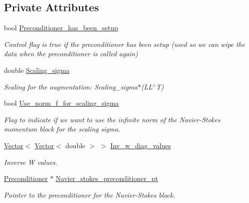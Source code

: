 \subsection*{Private Attributes}
\begin{DoxyCompactItemize}
\item 
bool \hyperlink{classoomph_1_1LagrangeEnforcedFlowPreconditioner_a4a886ec6c0ec223b5f24e27efcc9584b}{Preconditioner\+\_\+has\+\_\+been\+\_\+setup}
\begin{DoxyCompactList}\small\item\em Control flag is true if the preconditioner has been setup (used so we can wipe the data when the preconditioner is called again) \end{DoxyCompactList}\item 
double \hyperlink{classoomph_1_1LagrangeEnforcedFlowPreconditioner_aa555c464abd2ac23045a52336123c0a2}{Scaling\+\_\+sigma}
\begin{DoxyCompactList}\small\item\em Scaling for the augmentation\+: Scaling\+\_\+sigma$\ast$(L\+L$^\wedge$T) \end{DoxyCompactList}\item 
bool \hyperlink{classoomph_1_1LagrangeEnforcedFlowPreconditioner_a4da1aa7fd0b1a4f9d8eef074f4d1ed81}{Use\+\_\+norm\+\_\+f\+\_\+for\+\_\+scaling\+\_\+sigma}
\begin{DoxyCompactList}\small\item\em Flag to indicate if we want to use the infinite norm of the Navier-\/\+Stokes momentum block for the scaling sigma. \end{DoxyCompactList}\item 
\hyperlink{classoomph_1_1Vector}{Vector}$<$ \hyperlink{classoomph_1_1Vector}{Vector}$<$ double $>$ $>$ \hyperlink{classoomph_1_1LagrangeEnforcedFlowPreconditioner_a82c70d4dd69f67181ae6c4c93b4e284f}{Inv\+\_\+w\+\_\+diag\+\_\+values}
\begin{DoxyCompactList}\small\item\em Inverse W values. \end{DoxyCompactList}\item 
\hyperlink{classoomph_1_1Preconditioner}{Preconditioner} $\ast$ \hyperlink{classoomph_1_1LagrangeEnforcedFlowPreconditioner_a03e1316c85ca538a3b6912154e57fd42}{Navier\+\_\+stokes\+\_\+preconditioner\+\_\+pt}
\begin{DoxyCompactList}\small\item\em Pointer to the \textquotesingle{}preconditioner\textquotesingle{} for the Navier-\/\+Stokes block. \end{DoxyCompactList}\item 

\end{DoxyCompactItemize}

